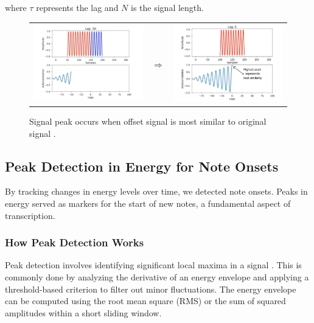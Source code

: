 \documentclass{article}
\begin{document}
where $\tau$ represents the lag and $N$ is the signal length.

\begin{figure}[H]
    \centering
    \begin{tabular}{ccc}
        \includegraphics[width=60mm]{images/autocorrelation.png} & 
        $\Longrightarrow$ & 
        \includegraphics[width=60mm]{images/autocorrelation Peak.png} \\
    \end{tabular}
    \caption{Signal peak occurs when offset signal is most similar to original signal \cite{visual-autocorr}.}
    \label{fig:autocorrelation_peak}
\end{figure}

\newpage

\subsection{Peak Detection in Energy for Note Onsets}
By tracking changes in energy levels over time, we detected note onsets. Peaks in energy served as markers for the start of new notes, a fundamental aspect of transcription.

\subsubsection{How Peak Detection Works}
Peak detection involves identifying significant local maxima in a signal \cite{ZhouRiess}. This is commonly done by analyzing the derivative of an energy envelope and applying a threshold-based criterion to filter out minor fluctuations. The energy envelope can be computed using the root mean square (RMS) or the sum of squared amplitudes within a short sliding window.
\end{document}
